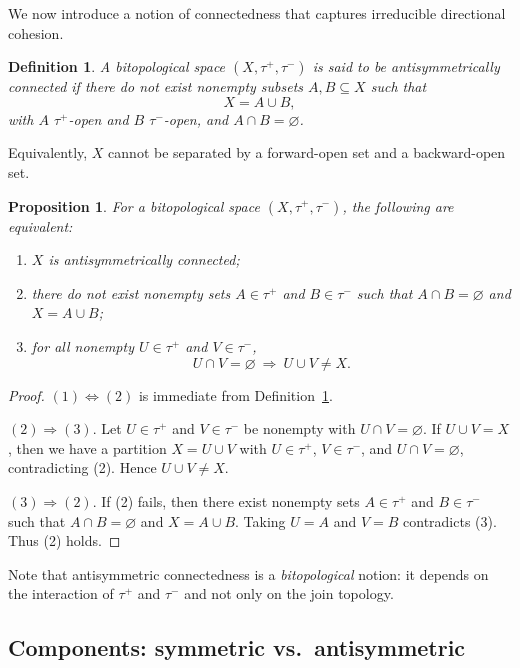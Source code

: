 \documentclass[preprint,12pt]{elsarticle}
\newtheorem{proposition}[theorem]{Proposition}
\newtheorem{definition}[theorem]{Definition}
\begin{document}
We now introduce a notion of connectedness that captures irreducible
directional cohesion.

\begin{definition}
\label{def:antisym-connected}
A bitopological space $(X,\tau^{+},\tau^{-})$ is said to be
\emph{antisymmetrically connected} if there do not exist nonempty
subsets $A,B\subseteq X$ such that
\[
X = A \cup B,
\]
with $A$ $\tau^{+}$-open and $B$ $\tau^{-}$-open, and $A\cap B=\varnothing$.
\end{definition}

\noindent
Equivalently, $X$ cannot be separated by a forward-open set and a
backward-open set.

\begin{proposition}
\label{prop:antisym-equivalences}
For a bitopological space $(X,\tau^{+},\tau^{-})$, the following are
equivalent:
\begin{enumerate}
\item $X$ is antisymmetrically connected;
\item there do not exist nonempty sets $A\in\tau^{+}$ and $B\in\tau^{-}$
such that $A\cap B=\varnothing$ and $X=A\cup B$;
\item for all nonempty $U\in\tau^{+}$ and $V\in\tau^{-}$,
\[
U\cap V=\varnothing \ \Longrightarrow\ U\cup V\neq X.
\]
\end{enumerate}
\end{proposition}

\begin{proof}
$(1)\Leftrightarrow(2)$ is immediate from Definition~\ref{def:antisym-connected}.

$(2)\Rightarrow(3)$.
Let $U\in\tau^{+}$ and $V\in\tau^{-}$ be nonempty with $U\cap V=\varnothing$.
If $U\cup V=X$, then we have a partition $X=U\cup V$ with $U\in\tau^{+}$,
$V\in\tau^{-}$, and $U\cap V=\varnothing$, contradicting (2). Hence
$U\cup V\neq X$.

$(3)\Rightarrow(2)$.
If (2) fails, then there exist nonempty sets $A\in\tau^{+}$ and
$B\in\tau^{-}$ such that $A\cap B=\varnothing$ and $X=A\cup B$. Taking
$U=A$ and $V=B$ contradicts (3). Thus (2) holds.
\end{proof}

\noindent
Note that antisymmetric connectedness is a \emph{bitopological} notion:
it depends on the interaction of $\tau^{+}$ and $\tau^{-}$ and not only
on the join topology.

\subsection{Components: symmetric vs.\ antisymmetric}
\label{ssec:components}
\end{document}
